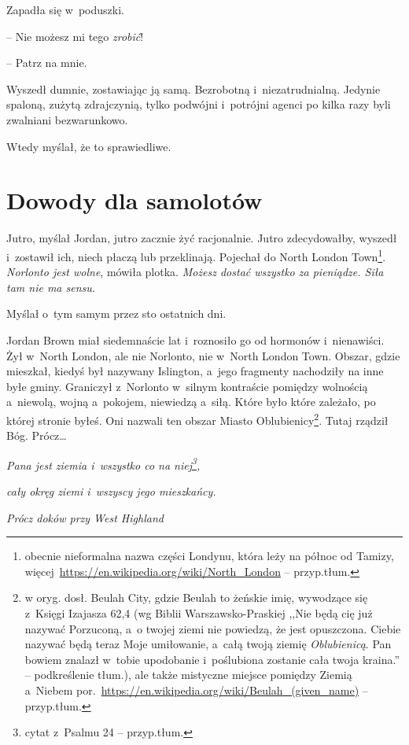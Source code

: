 \documentclass[oneside,polish,11pt,sfheadings]{mwbk}
\begin{document}
Zapadła się w~poduszki.

-- Nie możesz mi tego \emph{zrobić}!

-- Patrz na mnie.

Wyszedł dumnie, zostawiając ją samą. Bezrobotną i~niezatrudnialną.
Jedynie spaloną, zużytą zdrajczynią, tylko podwójni i~potrójni agenci po
kilka razy byli zwalniani bezwarunkowo.

Wtedy myślał, że to sprawiedliwe.

\chapter{Dowody dla samolotów}

Jutro, myślał Jordan, jutro zacznie żyć racjonalnie. Jutro zdecydowałby,
wyszedł i~zostawił ich, niech płaczą lub przeklinają. Pojechał do North
London Town\footnote{obecnie nieformalna nazwa części Londynu, która leży na
północ od Tamizy, więcej~\url{https://en.wikipedia.org/wiki/North\_London} -- przyp.tłum.}. \emph{Norlonto jest wolne}, mówiła plotka. \emph{Możesz
dostać wszystko za pieniądze. Siła tam nie ma sensu.}

Myślał o~tym samym przez sto ostatnich dni.

Jordan Brown miał siedemnaście lat i~roznosiło go od hormonów i~nienawiści. Żył w~North London, ale nie Norlonto, nie w~North London
Town. Obszar, gdzie mieszkał, kiedyś był nazywany Islington, a~jego
fragmenty nachodziły na inne byłe gminy. Graniczył z~Norlonto w~silnym
kontraście pomiędzy wolnością a~niewolą, wojną a~pokojem, niewiedzą a~siłą. Które było które zależało, po której stronie byłeś. Oni nazwali
ten obszar Miasto Oblubienicy\footnote{ w oryg. dosł. Beulah City, gdzie Beulah to
żeńskie imię, wywodzące się z~Księgi Izajasza 62,4 (wg Biblii
Warszawsko-Praskiej ,,Nie będą cię już nazywać Porzuconą, a~o twojej
ziemi nie powiedzą, że jest opuszczona. Ciebie nazywać będą teraz Moje
umiłowanie, a~całą twoją ziemię \emph{Oblubienicą}. Pan bowiem znalazł w~tobie upodobanie i~poślubiona zostanie cała twoja kraina.'' --
podkreślenie tłum.), ale także mistyczne miejsce pomiędzy Ziemią a~Niebem
por.~\url{https://en.wikipedia.org/wiki/Beulah\_(given\_name)}
-- przyp.tłum.}. Tutaj rządził Bóg. Prócz\ldots

\emph{Pana jest ziemia i~wszyst\-ko co na niej\footnote{cytat z~Psalmu 24 -- przyp.tłum.},}

\emph{cały okręg ziemi i~wszyscy jego mieszkańcy.}

\emph{Prócz doków przy West Highland}
\end{document}
